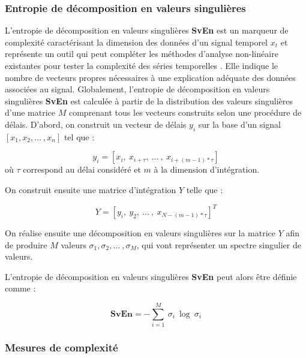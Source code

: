 \subsubsection*{Entropie de décomposition en valeurs singulières}

L'entropie de décomposition en valeurs singulières \textbf{SvEn} est un marqueur de complexité caractérisant la dimension des données d'un signal temporel $x_t$ \citep{varshavsky2006novel, banerjee2014feature} et représente un outil qui peut compléter les méthodes d'analyse non-linéaire existantes pour tester la complexité des séries temporelles \citep{alvarez2021singular}.
Elle indique le nombre de vecteurs propres nécessaires à une explication adéquate des données associées au signal. 
Globalement, l'entropie de décomposition en valeurs singulières \textbf{SvEn} est calculée à partir de la distribution des valeurs singulières d'une matrice $M$ comprenant tous les vecteurs construits selon une procédure de délais. 
D'abord, on construit un vecteur de délais $y_i$ sur la base d'un signal $[x_1, x_2, \ldots~, x_n]$ tel que : 

\begin{equation}
y_i = [x_i,~x_{i+\tau},~\ldots~,~x_{i+(m-1)*\tau}]
\end{equation}
où $\tau$ correspond au délai considéré et $m$ à la dimension d'intégration. 

On construit ensuite une matrice d'intégration $Y$ telle que : 

\begin{equation}
Y = [y_i,~y_2,~\ldots~,~x_{N-(m-1)*\tau}]^T
\end{equation}

On réalise ensuite une décomposition en valeurs singulières sur la matrice $Y$ afin de produire $M$ valeurs $\sigma_1, \sigma_2, \ldots~, \sigma_M$, qui vont représenter un spectre singulier de valeurs. 

L'entropie de décomposition en valeurs singulières \textbf{SvEn} peut alors être définie comme : 

\begin{equation}
\textbf{SvEn} = -\sum_{i=1}^M~\sigma_i~\log~\sigma_i
\end{equation}

\subsubsection{Mesures de complexité}

